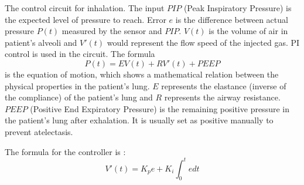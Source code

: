 \documentclass{article}
\begin{document}
The control circuit for inhalation. The input $PIP$ (Peak Inspiratory Pressure) is the expected level of pressure to reach. Error $e$ is the difference between actual pressure $P(t)$ measured by the sensor and $PIP$. $V(t)$ is the volume of air in patient's alveoli and $V'(t)$ would represent the flow speed of the injected gas. PI control is used in the circuit. The formula
$$P(t)=EV(t)+RV'(t)+PEEP$$
is the equation of motion, which shows a mathematical relation between the physical properties in the patient's lung. $E$ represents the elastance (inverse of the compliance) of the patient's lung and $R$ represents the airway resistance. $PEEP$ (Positive End Expiratory Pressure) is the remaining positive pressure in the patient's lung after exhalation. It is usually set as positive manually to prevent atelectasis. 

The formula for the controller is :
$$V'(t)=K_pe+K_i\int _0^tedt$$

\newpage
\end{document}
